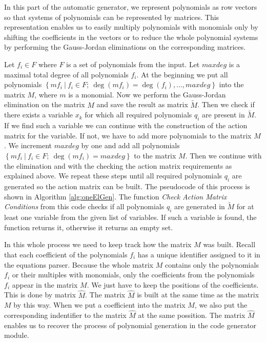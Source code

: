 In this part of the automatic generator, we represent polynomials as row vectors so that systems of polynomials can be represented by matrices. This representation enables us to easily multiply polynomials with monomials only by shifting the coefficients in the vectors or to reduce the whole polynomial systems by performing the Gauss-Jordan eliminations on the corresponding matrices.

Let $f_i \in F$ where $F$ is a set of polynomials from the input. Let $maxdeg$ is a maximal total degree of all polynomials $f_i$. At the beginning we put all polynomials $\left\{m f_i\ |\ f_i \in F;\ \deg(m f_i) = \deg(f_i),\dots, maxdeg\right\}$ into the matrix $M$, where $m$ is a monomial. Now we perform the Gauss-Jordan elimination on the matrix $M$ and save the result as matrix $\tilde{M}$. Then we check if there exists a variable $x_k$ for which all required polynomials $q_i$ are present in $\tilde{M}$. If we find such a variable we can continue with the construction of the action matrix for the variable. If not, we have to add more polynomials to the matrix $M$. We increment $maxdeg$ by one and add all polynomials $\left\{m f_i\ |\ f_i \in F;\ \deg(m f_i) = maxdeg\right\}$ to the matrix $M$. Then we continue with the elimination and with the checking the action matrix requirements as explained above. We repeat these steps until all required polynomials $q_i$ are generated so the action matrix can be built. The pseudocode of this process is shown in Algorithm \ref{alg:oneElGen}. The function \textit{Check Action Matrix Conditions} from this code checks if all polynomials $q_i$ are generated in $\tilde{M}$ for at least one variable from the given list of variables. If such a variable is found, the function returns it, otherwise it returns an empty set.



In this whole process we need to keep track how the matrix $M$ was built. Recall that each coefficient of the polynomials $f_i$ has a unique identifier assigned to it in the equations parser. Because the whole matrix $M$ contains only the polynomials $f_i$ or their multiples with monomials, only the coefficients from the polynomials $f_i$ appear in the matrix $M$. We just have to keep the positions of the coefficients. This is done by matrix $\hat{M}$. The matrix $\hat{M}$ is built at the same time as the matrix $M$ by this way. When we put a coefficient into the matrix $M$, we also put the corresponding indentifier to the matrix $\hat{M}$ at the same possition. The matrix $\hat{M}$ enables us to recover the process of polynomial generation in the code generator module.

